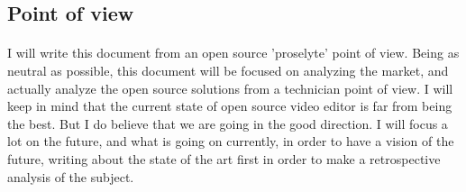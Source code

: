 \subsection{Point of view}
  \paragraph{}
    I will write this document from an open source 'proselyte' point of
    view. Being as neutral as possible, this document will be focused on
    analyzing the market, and actually analyze the open source solutions from
    a technician point of view. I will keep in mind that the current state
    of open source video editor is far from being the best. But I do believe
    that we are going in the good direction. I will focus a lot on the future,
    and what is going on currently, in order to have a vision of the future,
    writing about the state of the art first in order to make a retrospective 
    analysis of the subject.
